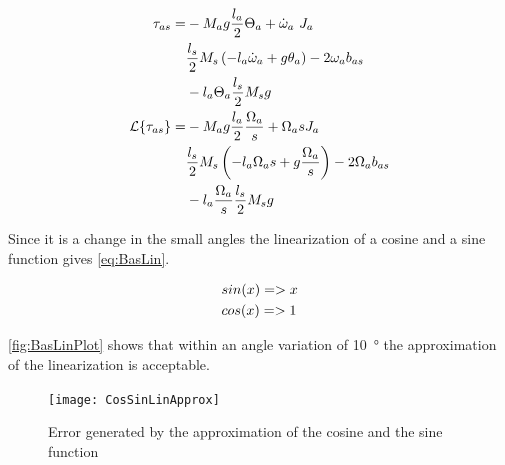 \begin{subequations}\label{eq:FinalTauAS}
	\begin{flalign}
		\tau_{as} =	&-M_a g  \frac{l_a}{2} \Theta_a+\dot\omega_a\  J_a \notag \\
					&\frac{l_s}{2}M_s\left(-l_a\dot{\omega}_a+g\theta_a\right)-2\omega_a b_{as}\notag \\
					&-l_a \Theta_a  \frac{l_s}{2} M_s g \addunit{\newton\meter}\\
		\mathcal{L}\{\tau_{as}\} = 	&-M_a g  \frac{l_a}{2} \frac{\Omega_a}{s}+\Omega_a s J_a \notag \\
									&\frac{l_s}{2}M_s\left(-l_a\Omega_a s+g\frac{\Omega_a}{s}\right)-2\Omega_a b_{as}\notag \\
									&-l_a \frac{\Omega_a}{s}  \frac{l_s}{2} M_s g \addunit{1}
	\end{flalign}
\end{subequations} 

Since it is a change in the small angles the linearization of a cosine and a sine function gives \autoref{eq:BasLin}.

\begin{subequations}\label{eq:BasLin}
	\begin{flalign}
		&sin(x)=>x \addunit{1}\\
		&cos(x)=>1 \addunit{1}
	\end{flalign}
\end{subequations}

\autoref{fig:BasLinPlot} shows that within an angle variation of \SI{10}{\degree} the approximation of the linearization is acceptable.

\begin{figure}[htbp]
	\centering
	\texttt{[image: CosSinLinApprox]}
	\caption{Error generated by the approximation of the cosine and the sine function}\label{fig:BasLinPlot}
\end{figure}